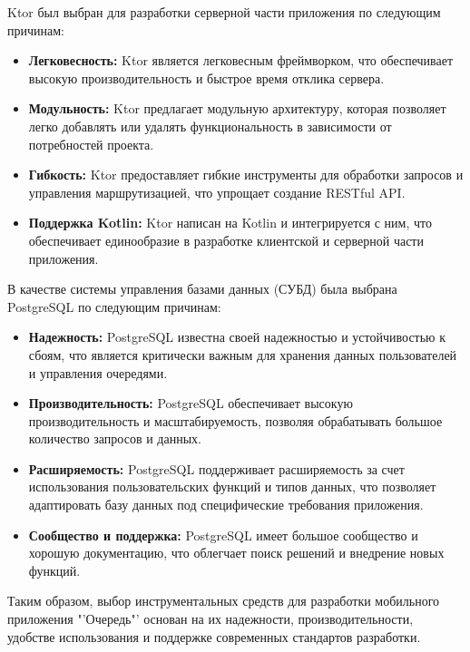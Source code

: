 
Ktor был выбран для разработки серверной части приложения
по следующим причинам:

\begin{itemize}
    \item \textbf{Легковесность:} Ktor является легковесным фреймворком,
		что обеспечивает высокую производительность
		и быстрое время отклика сервера.
    \item \textbf{Модульность:} Ktor предлагает модульную архитектуру,
		которая позволяет легко добавлять или удалять функциональность
		в зависимости от потребностей проекта.
    \item \textbf{Гибкость:} Ktor предоставляет гибкие инструменты
		для обработки запросов и управления маршрутизацией,
		что упрощает создание RESTful API.
    \item \textbf{Поддержка Kotlin:} Ktor написан на Kotlin и интегрируется
		с ним, что обеспечивает единообразие в разработке клиентской
		и серверной части приложения.
\end{itemize}


В качестве системы управления базами данных (СУБД)
была выбрана PostgreSQL по следующим причинам:

\begin{itemize}
    \item \textbf{Надежность:} PostgreSQL известна своей надежностью
		и устойчивостью к сбоям, что является критически важным
		для хранения данных пользователей и управления очередями.
    \item \textbf{Производительность:} PostgreSQL обеспечивает высокую
		производительность и масштабируемость,
		позволяя обрабатывать большое количество запросов и данных.
    \item \textbf{Расширяемость:} PostgreSQL поддерживает расширяемость
		за счет использования пользовательских функций и типов данных,
		что позволяет адаптировать базу данных
		под специфические требования приложения.
    \item \textbf{Сообщество и поддержка:} PostgreSQL имеет большое сообщество
		и хорошую документацию, что облегчает поиск решений
		и внедрение новых функций.
\end{itemize}

Таким образом, выбор инструментальных средств
для разработки мобильного приложения "'Очередь"' основан на их надежности,
производительности, удобстве использования
и поддержке современных стандартов разработки.

